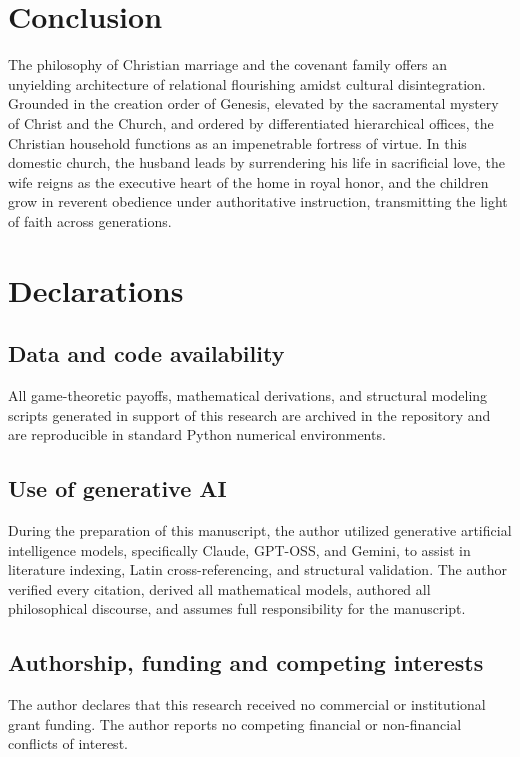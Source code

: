 \documentclass[11pt,twocolumn]{article}
\begin{document}
\section{Conclusion}
The philosophy of Christian marriage and the covenant family offers an unyielding architecture of relational flourishing amidst cultural disintegration. Grounded in the creation order of Genesis, elevated by the sacramental mystery of Christ and the Church, and ordered by differentiated hierarchical offices, the Christian household functions as an impenetrable fortress of virtue. In this domestic church, the husband leads by surrendering his life in sacrificial love, the wife reigns as the executive heart of the home in royal honor, and the children grow in reverent obedience under authoritative instruction, transmitting the light of faith across generations.

\section*{Declarations}

\subsection*{Data and code availability}
All game-theoretic payoffs, mathematical derivations, and structural modeling scripts generated in support of this research are archived in the repository and are reproducible in standard Python numerical environments.

\subsection*{Use of generative AI}
During the preparation of this manuscript, the author utilized generative artificial intelligence models, specifically Claude, GPT-OSS, and Gemini, to assist in literature indexing, Latin cross-referencing, and structural validation. The author verified every citation, derived all mathematical models, authored all philosophical discourse, and assumes full responsibility for the manuscript.

\subsection*{Authorship, funding and competing interests}
The author declares that this research received no commercial or institutional grant funding. The author reports no competing financial or non-financial conflicts of interest.
\end{document}
